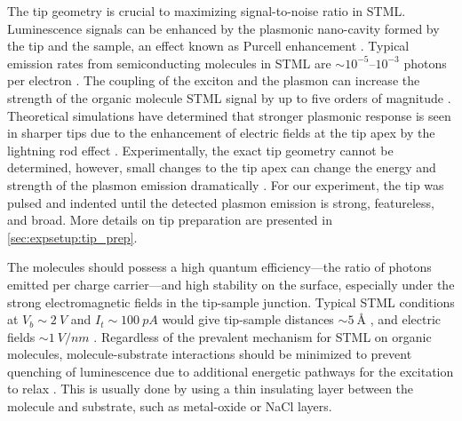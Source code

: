 The tip geometry is crucial to maximizing signal-to-noise ratio in \ac{STML}. Luminescence signals can be enhanced by the plasmonic nano-cavity formed by the tip and the sample, an effect known as Purcell enhancement \citep{purcell1946spontaneous}. Typical emission rates from semiconducting molecules in \ac{STML} are $\sim 10^{-5}$--$10^{-3}$ photons per electron \citep{johansson1998light, zhang2011fabrication}. The coupling of the exciton and the plasmon can increase the strength of the organic molecule \ac{STML} signal by up to five orders of magnitude \citep{chen2015molecular}. Theoretical simulations have determined that stronger plasmonic response is seen in sharper tips due to the enhancement of electric fields at the tip apex by the lightning rod effect \citep{novotny2012principles, aizpurua2000role}. Experimentally, the exact tip geometry cannot be determined, however, small changes to the tip apex can change the energy and strength of the plasmon emission dramatically \citep{meguro2002origin}. For our experiment, the tip was pulsed and indented until the detected plasmon emission is strong, featureless, and broad. More details on tip preparation are presented in \autoref{sec:expsetup:tip_prep}.

The molecules should possess a high quantum efficiency---the ratio of photons emitted per charge carrier---and high stability on the surface, especially under the strong electromagnetic fields in the tip-sample junction. Typical \ac{STML} conditions at $V_b \sim \SI{2}{V}$ and $I_t \sim \SI{100}{pA}$ would give tip-sample distances $\sim \SI{5}{\angstrom}$ \citep{Qiu2003}, and electric fields $\sim \SI{1}{V/nm}$ \citep{grosse2014dynamic}.  Regardless of the prevalent mechanism for \ac{STML} on organic molecules, molecule-substrate interactions should be minimized to prevent quenching of luminescence due to additional energetic pathways for the excitation to relax \citep{kuhnke2017atomic, rossel2010fluorescence}. This is usually done by using a thin insulating layer between the molecule and substrate, such as metal-oxide or NaCl layers. 









\endinput








\subsection{garbage}
\begin{equation}
    I_t \propto e^{-2kz},
\end{equation}

